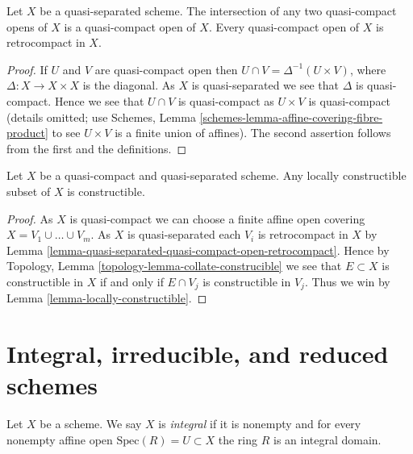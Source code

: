 \begin{lemma}
\label{lemma-quasi-separated-quasi-compact-open-retrocompact}
Let $X$ be a quasi-separated scheme. The intersection of any two
quasi-compact opens of $X$ is a quasi-compact open of $X$.
Every quasi-compact open of $X$ is retrocompact in $X$.
\end{lemma}

\begin{proof}
If $U$ and $V$ are quasi-compact open then
$U \cap V = \Delta^{-1}(U \times V)$, where $\Delta : X \to X \times X$
is the diagonal. As $X$ is quasi-separated we see that $\Delta$ is
quasi-compact. Hence we see that $U \cap V$ is quasi-compact as
$U \times V$ is quasi-compact (details omitted; use
Schemes, Lemma \ref{schemes-lemma-affine-covering-fibre-product}
to see $U \times V$ is a finite union of affines).
The second assertion follows from the first and the definitions.
\end{proof}

\begin{lemma}
\label{lemma-constructible-quasi-compact-quasi-separated}
Let $X$ be a quasi-compact and quasi-separated scheme.
Any locally constructible subset of $X$ is constructible.
\end{lemma}

\begin{proof}
As $X$ is quasi-compact we can choose a finite affine open covering
$X = V_1 \cup \ldots \cup V_m$. As $X$ is quasi-separated each $V_i$ is
retrocompact in $X$ by
Lemma \ref{lemma-quasi-separated-quasi-compact-open-retrocompact}.
Hence by
Topology, Lemma \ref{topology-lemma-collate-construcible}
we see that $E \subset X$ is constructible in $X$ if and only if
$E \cap V_j$ is constructible in $V_j$. Thus we win by
Lemma \ref{lemma-locally-constructible}.
\end{proof}




\section{Integral, irreducible, and reduced schemes}
\label{section-integral}

\begin{definition}
\label{definition-integral}
Let $X$ be a scheme. We say $X$ is {\it integral} if it is nonempty and
for every nonempty affine open $\text{Spec}(R) = U \subset X$ the ring $R$
is an integral domain.
\end{definition}

